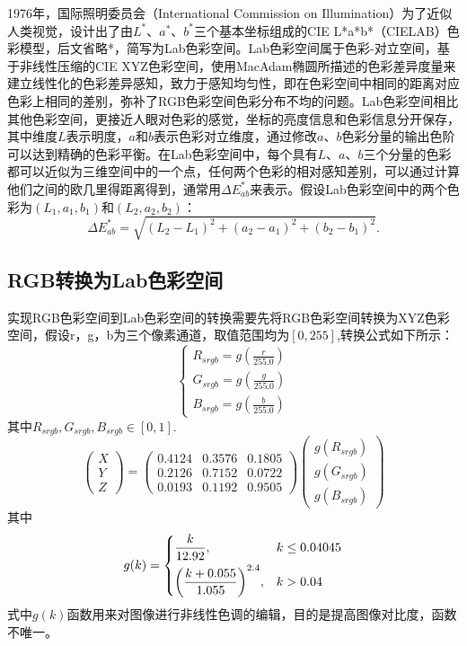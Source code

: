 \documentclass[UTF8,a4paper,twoside]{ctexart}
\begin{document}
1976年，国际照明委员会（International Commission on Illumination）为了近似人类视觉，设计出了由$L^*$、$a^*$、$b^*$三个基本坐标组成的CIE L*a*b*（CIELAB）色彩模型，后文省略*，简写为Lab色彩空间。Lab色彩空间属于色彩-对立空间，基于非线性压缩的CIE XYZ色彩空间，使用MacAdam椭圆所描述的色彩差异度量来建立线性化的色彩差异感知，致力于感知均匀性，即在色彩空间中相同的距离对应色彩上相同的差别，弥补了RGB色彩空间色彩分布不均的问题。Lab色彩空间相比其他色彩空间，更接近人眼对色彩的感觉，坐标的亮度信息和色彩信息分开保存，其中维度$L$表示明度，$a$和$b$表示色彩对立维度，通过修改$a$、$b$色彩分量的输出色阶可以达到精确的色彩平衡。在Lab色彩空间中，每个具有$L$、$a$、$b$三个分量的色彩都可以近似为三维空间中的一个点，任何两个色彩的相对感知差别，可以通过计算他们之间的欧几里得距离得到，通常用$\Delta E_{ab}^*$来表示。假设Lab色彩空间中的两个色彩为$(L_1,a_1,b_1)$和$(L_2,a_2,b_2)$：
\begin{equation}
  \Delta E_{ab}^* = \sqrt{(L_2 - L_1)^2 + (a_2 - a_1)^2 + (b_2 - b_1)^2}.
\end{equation}


\subsection{RGB转换为Lab色彩空间}
实现RGB色彩空间到Lab色彩空间的转换需要先将RGB色彩空间转换为XYZ色彩空间，假设r，g，b为三个像素通道，取值范围均为$[0,255]$,转换公式如下所示：
\begin{equation}
  \left\{
    \begin{gathered}
      R_{srgb} = g(\frac{r}{255.0}) \\
      G_{srgb} = g(\frac{g}{255.0}) \\
      B_{srgb} = g(\frac{b}{255.0})
    \end{gathered}
  \right.
\end{equation}
其中$R_{srgb},G_{srgb},B_{srgb} \in [0,1]$.
\begin{equation}
  \begin{pmatrix}
    X \\ Y \\ Z
  \end{pmatrix} =
  \begin{pmatrix}
    0.4124 & 0.3576 & 0.1805 \\
    0.2126 & 0.7152 & 0.0722 \\
    0.0193 & 0.1192 & 0.9505
  \end{pmatrix}
  \begin{pmatrix}
    g(R_{srgb}) \\
    g(G_{srgb}) \\
    g(B_{srgb})
  \end{pmatrix}
\end{equation}
其中
\begin{equation}
  g(k) =
  \begin{dcases}
    \frac{k}{12.92}, & k \leq 0.04045 \\
    {\left(\frac{k+0.055}{1.055}\right)}^{2.4}, & k > 0.04
  \end{dcases}
\end{equation}
式中$g(k)$函数用来对图像进行非线性色调的编辑，目的是提高图像对比度，函数不唯一。
\end{document}
